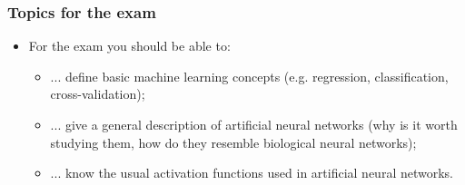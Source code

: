 \begin{frame}
  \frametitle{Topics for the exam}
  \begin{itemize}
  \item For the exam you should be able to:
    \begin{itemize}
    \item ... define basic machine learning concepts (e.g. regression,
      classification, cross-validation);
    \item ... give a general description of artificial neural networks
      (why is it worth studying them, how do they resemble biological
      neural networks);
    \item ... know the usual activation functions used in artificial
      neural networks.
    \end{itemize}
  \end{itemize}
\end{frame}



